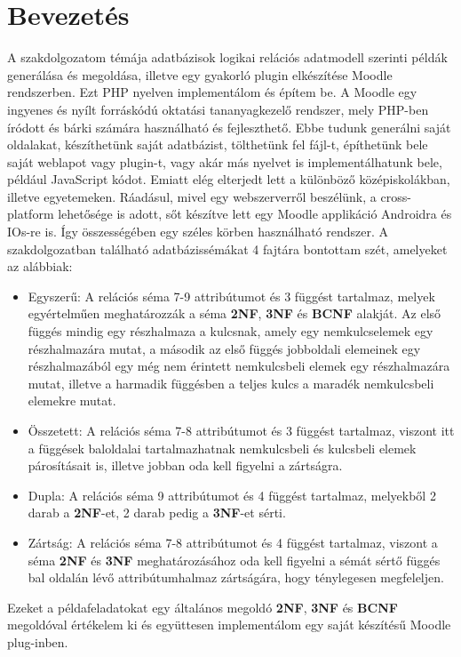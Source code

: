 \chapter*{Bevezetés}
A szakdolgozatom témája adatbázisok logikai relációs adatmodell szerinti példák generálása és megoldása, illetve egy gyakorló plugin elkészítése Moodle rendszerben. Ezt PHP nyelven implementálom és építem be. A Moodle egy ingyenes és nyílt forráskódú oktatási tananyagkezelő rendszer, mely PHP-ben íródott és bárki számára használható és fejleszthető. Ebbe tudunk generálni saját oldalakat, készíthetünk saját adatbázist, tölthetünk fel fájl-t, építhetünk bele saját weblapot vagy plugin-t, vagy akár más nyelvet is implementálhatunk bele, például JavaScript kódot. Emiatt elég elterjedt lett a különböző középiskolákban, illetve egyetemeken. Ráadásul, mivel egy webszerverről beszélünk, a cross-platform lehetősége is adott, sőt készítve lett egy Moodle applikáció Androidra és IOs-re is. Így összességében egy széles körben használható rendszer. \hfill \newline
A szakdolgozatban található adatbázissémákat 4 fajtára bontottam szét, amelyeket az alábbiak:\hfill \newline
\begin{itemize}
    \item Egyszerű: A relációs séma 7-9 attribútumot és 3 függést tartalmaz, melyek egyértelműen meghatározzák a séma \textbf{2NF}, \textbf{3NF} és \textbf{BCNF} alakját. Az első függés mindig egy részhalmaza a kulcsnak, amely egy nemkulcselemek egy részhalmazára mutat, a második az első függés jobboldali elemeinek egy részhalmazából egy még nem érintett nemkulcsbeli elemek egy részhalmazára mutat, illetve a harmadik függésben a teljes kulcs a maradék nemkulcsbeli elemekre mutat.
    \item Összetett: A relációs séma 7-8 attribútumot és 3 függést tartalmaz, viszont itt a függések baloldalai tartalmazhatnak nemkulcsbeli és kulcsbeli elemek párosításait is, illetve jobban oda kell figyelni a zártságra.
    \item Dupla: A relációs séma 9 attribútumot és 4 függést tartalmaz, melyekből 2 darab a \textbf{2NF}-et, 2 darab pedig a \textbf{3NF}-et sérti.
    \item Zártság: A relációs séma 7-8 attribútumot és 4 függést tartalmaz, viszont a séma \textbf{2NF} és \textbf{3NF} meghatározásához oda kell figyelni a sémát sértő függés bal oldalán lévő attribútumhalmaz zártságára, hogy ténylegesen megfeleljen.
\end{itemize}
Ezeket a példafeladatokat egy általános megoldó \textbf{2NF}, \textbf{3NF} és \textbf{BCNF} megoldóval értékelem ki és együttesen implementálom egy saját készítésű Moodle plug-inben.\hfill \newline

